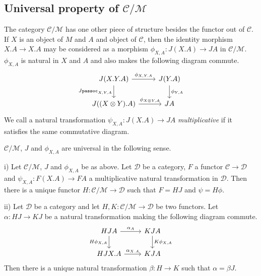 \documentclass{svproc}
\newcommand\C{\mathcal{C}}
\newcommand\D{\mathcal{D}}
\newcommand\M{\mathcal{M}}
\newcommand{\passoc}{\texttt{passoc}}
\newcommand\tensor\otimes
\newcommand*\from{\colon}
\newcommand{\0}{{\mathtt{0}}} \newcommand{\com}{{\mathtt{com}}}
\begin{document}
\subsection{Universal property of $\C/\M$}

The category $\C/\M$ has one other piece of structure besides the functor out of $\C$.  
If $X$ is an object of $M$ and $A$ and object of $\C$, then the identity morphism $X.A\to X.A$ may be considered as a morphism $\phi_{X,A}\from J(X.A) \to JA$ in $\C/\M$.  
$\phi_{X,A}$ is natural in $X$ and $A$ and also makes the following diagram commute.
\[
  \begin{tikzcd}
    J(X.Y.A) \arrow[r, "\phi_{X,Y.A}"] \arrow[d, "J\passoc_{X,Y,A}"']
      & J(Y.A) \arrow[d, "\phi_{Y,A}"] \\
    J((X\tensor Y).A) \arrow[r, "\phi_{X\tensor Y,A}"]
      & JA
  \end{tikzcd}
  \]
We call a natural transformation $\psi_{X,A}\from J(X.A) \to JA$ \emph{multiplicative} if it satisfies the same commutative diagram.

$\C/\M$, $J$ and $\phi_{X,A}$ are universal in the following sense.

\begin{proposition}
  i) Let $\C/\M$, $J$ and $\phi_{X,A}$ be as above.  
  Let $\D$ be a category, $F$ a functor $\C\to \D$ and $\psi_{X,A}\from F(X.A) \to FA$ a multiplicative natural transformation in $\D$.  
  Then there is a unique functor $H\from \C/\M\to \D$ such that $F=H J$ and $\psi=H\phi$.

  ii) Let $\D$ be a category and let $H,K\from \C/\M\to \D$ be two functors.  
  Let $\alpha\from HJ \to KJ$ be a natural transformation making the following diagram commute.
  \[
    \begin{tikzcd}
      HJ A \arrow[r, "\alpha_A"] \arrow[d, "H\phi_{X,A}"']
        & KJ A \arrow[d, "K\phi_{X,A}"] \\
      HJ X.A \arrow[r, "\alpha_{X.A}"]
        & KJ A
    \end{tikzcd}
    \]
  Then there is a unique natural transformation $\beta\from H\to K$ such that $\alpha=\beta J$.
  \label{quotient-universal}
\end{proposition}
\end{document}
